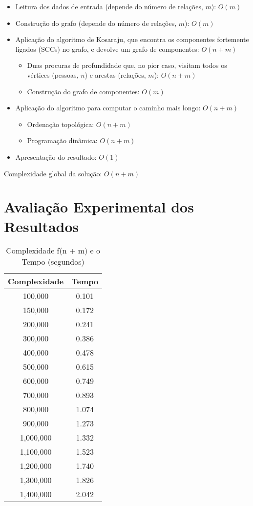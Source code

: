 \documentclass[12pt]{article}
\begin{document}
\begin{itemize}
    \item Leitura dos dados de entrada (depende do número de relações, \(m\)): \(O(m)\)
    \item Construção do grafo (depende do número de relações, \(m\)): \(O(m)\)
    \item Aplicação do algoritmo de Kosaraju, que encontra os componentes fortemente ligados (SCCs) no grafo, e devolve um grafo de componentes: \(O(n + m)\)
        \begin{itemize}
            \item Duas procuras de profundidade que, no pior caso, visitam todos os vértices (pessoas, \(n\)) e arestas (relações, \(m\)): \(O(n + m)\)
            \item Construção do grafo de componentes: \(O(m)\)
        \end{itemize}
    \item Aplicação do algoritmo para computar o caminho mais longo: \(O(n + m)\)
        \begin{itemize}
            \item Ordenação topológica: \(O(n + m)\)
            \item Programação dinâmica: \(O(n + m)\)
        \end{itemize}
    \item Apresentação do resultado: \(O(1)\)
\end{itemize}

Complexidade global da solução: \(O(n + m)\)

\section{Avaliação Experimental dos Resultados}

\begin{table}[h]
    \centering
    \begin{tabular}{|c|c|}
        \hline
        \textbf{Complexidade} & \textbf{Tempo} \\
        \hline
        100,000 & 0.101 \\
        150,000 & 0.172 \\
        200,000 & 0.241 \\
        300,000 & 0.386 \\
        400,000 & 0.478 \\
        500,000 & 0.615 \\
        600,000 & 0.749 \\
        700,000 & 0.893 \\
        800,000 & 1.074 \\
        900,000 & 1.273 \\
        1,000,000 & 1.332 \\
        1,100,000 & 1.523 \\
        1,200,000 & 1.740 \\
        1,300,000 & 1.826 \\
        1,400,000 & 2.042 \\
        \hline
    \end{tabular}
    \caption{Complexidade f(n + m) e o Tempo (segundos)}
\end{table}
\end{document}
